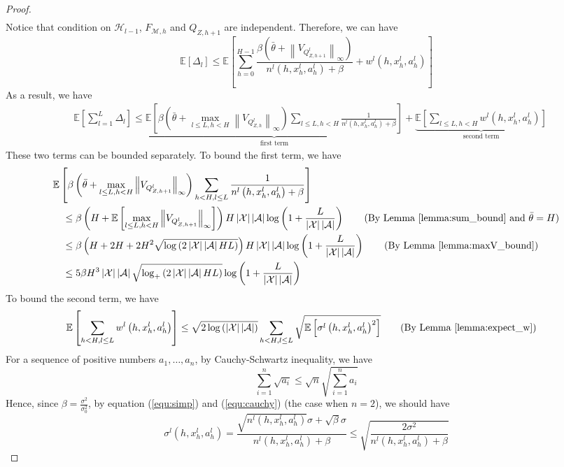 \documentclass[letterpaper]{article} %
\newcommand{\Sp}[1]{\left(#1\right)}
\newcommand{\Mp}[1]{\left[#1\right]}
\newcommand{\abs}[1]{\left|#1\right|}
\newcommand{\Norm}[1]{\left\|#1\right\|}
\newcommand{\E}{\mathbb{E}}
\newcommand{\M}{\mathcal{M}}
\newcommand{\aX}{\abs{\mathcal{X}}}
\newcommand{\aA}{\abs{\mathcal{A}}}
\theoremstyle{definition}
\begin{document}
\begin{proof}
\begin{align*}
\end{align*}
Notice that condition on $\mathcal{H}_{l-1}$, $F_{\M, h}$ and $Q_{Z, h+1}$ are independent. Therefore, we can have
$$\E\Mp{\Delta_l}\leq \E\Mp{\sum_{h=0}^{H-1}\frac{\beta\Sp{\bar{\theta}+\Norm{V_{Q_{Z, h+1}^l}}_{\infty}}}{n^l\Sp{h, x_h^l, a_h^l}+\beta}+w^l\Sp{h, x_h^l, a_h^l}}$$
As a result, we have
\begin{align*}
    &\E\Mp{\sum_{l=1}^{L}\Delta_l}\leq \underbrace{\E\Mp{\beta\Sp{\bar{\theta} + \max_{l\leq L, h<H}\Norm{V_{Q^l_{Z, h}}}_{\infty}}\sum_{l\leq L, h< H}\frac{1}{n^l\Sp{h, x_h^l, a_h^l}+\beta}}}_{\text{first term}}+\underbrace{\E\Mp{\sum_{l\leq L, h< H}w^l\Sp{h, x_h^l, a_h^l}}}_{\text{second term}}
\end{align*}
These two terms can be bounded separately. To bound the first term, we have
\begin{align*}
	& \E\Mp{\beta\Sp{\bar{\theta}+\max_{l\leq L, h< H}\Norm{V_{Q^l_{Z, h+1}}}_{\infty}}\sum_{h<H, l\leq L}\frac{1}{n^l\Sp{h, x_h^l, a_h^l}+\beta}}\\
	&\quad\leq \beta\Sp{H+\E\Mp{\max_{l\leq L, h< H}\Norm{V_{Q^l_{Z, h+1}}}_{\infty}}}H\aX\aA\log\Sp{1+\frac{L}{\aX\aA}}\tag{By Lemma \ref{lemma:sum_bound} and $\bar{\theta}=H$}\\
	&\quad\leq \beta\Sp{H+2H+2H^2\sqrt{\log\Sp{2\aX\aA HL}}}H\aX\aA\log\Sp{1+\frac{L}{\aX\aA}}\tag{By Lemma \ref{lemma:maxV_bound}}\\
	&\quad\leq 5\beta H^3\aX\aA\sqrt{\log_+\Sp{2\aX\aA HL}}\log\Sp{1+\frac{L}{\aX\aA}}
\end{align*}
To bound the second term, we have
\begin{align*}
	\E\Mp{\sum_{h<H, l\leq L}w^l\Sp{h, x_h^l, a_h^l}}&\leq\sqrt{2\log\Sp{\aX\aA}}\sum_{h<H, l\leq L}\sqrt{\E\Mp{\sigma^l\Sp{h, x_h^l, a_h^l}^2}}\tag{By Lemma \ref{lemma:expect_w}}
\end{align*}
For a sequence of positive numbers $a_1, \dots, a_n$, by Cauchy-Schwartz inequality, we have
\begin{equation}
	\label{equ:cauchy}
	\sum_{i=1}^{n}\sqrt{a_i}\leq\sqrt{n}\sqrt{\sum_{i=1}^{n}a_i}
\end{equation}
Hence, since $\beta=\frac{\sigma^2}{\sigma_0^2}$, by equation (\ref{equ:simp}) and (\ref{equ:cauchy}) (the case when $n=2$), we should have
\begin{equation}
	\label{equ:sigma_bound}
	\sigma^l\Sp{h, x_h^l, a_h^l}=\frac{\sqrt{n^l\Sp{h, x_h^l, a_h^l}}\sigma+\sqrt{\beta}\sigma}{n^l\Sp{h, x_h^l, a_h^l}+\beta}\leq\sqrt{\frac{2\sigma^2}{n^l\Sp{h, x_h^l, a_h^l}+\beta}}

\end{equation}
\end{proof}
\end{document}
